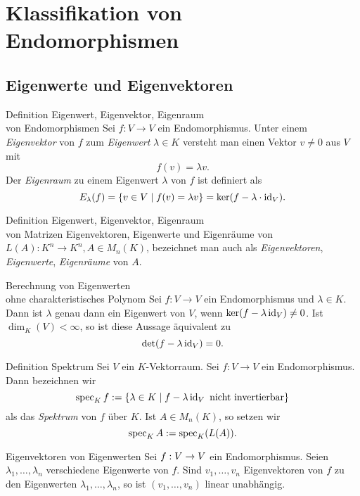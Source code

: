 \documentclass[main.tex]{subfiles}
\begin{document}
\section*{Klassifikation von Endomorphismen}
\subsection*{Eigenwerte und Eigenvektoren}

\begin{karte}{Definition Eigenwert, Eigenvektor, Eigenraum\\von Endomorphismen}
    Sei \( f: V \rightarrow V \) ein Endomorphismus. Unter 
    einem \textit{Eigenvektor} von \(f\) zum \textit{Eigenwert} 
    \(\lambda \in K\) versteht man einen Vektor \(v \neq 0\) aus 
    \(V\) mit 
    \[ f(v) = \lambda v. \]
    Der \textit{Eigenraum} zu einem Eigenwert \( \lambda \) von 
    \(f\) ist definiert als 
    \[ E_\lambda(f) = \{ v \in V \;\vert \; f(v) = \lambda v \} 
    = \ker(f - \lambda \cdot \operatorname{id}_V). \]
\end{karte}
\begin{karte}{Definition Eigenwert, Eigenvektor, Eigenraum\\von Matrizen}
    Eigenvektoren, Eigenwerte und Eigenräume von 
    \( L(A) : K^n \rightarrow K^n, A \in M_n(K) \), bezeichnet 
    man auch als \textit{Eigenvektoren}, \textit{Eigenwerte}, 
    \textit{Eigenräume} von \(A\).
\end{karte}
\begin{karte}{Berechnung von Eigenwerten\\ohne charakteristisches Polynom}
    Sei \( f: V \rightarrow V \) ein Endomorphismus und 
    \( \lambda \in K \). Dann ist \( \lambda \) genau dann ein 
    Eigenwert von \( V \), wenn 
    \( \ker(f - \lambda \operatorname{id}_V) \neq 0 \). Ist 
    \( \dim_K(V) < \infty \), so ist diese Aussage äquivalent zu 
    \[ \det(f - \lambda \operatorname{id}_V) = 0. \]
\end{karte}
\begin{karte}{Definition Spektrum}
    Sei \(V\) ein \(K\)-Vektorraum. Sei 
    \( f: V \rightarrow V \) ein Endomorphismus. Dann 
    bezeichnen wir 
    \[ \operatorname{spec}_K f := \{ \lambda \in K 
    \;\vert \; f - \lambda \operatorname{id}_V \text{ nicht invertierbar} \} \]
    als das \textit{Spektrum} von \(f\) über \(K\). Ist 
    \( A \in M_n(K) \), so setzen wir 
    \[ \operatorname{spec}_K A := \operatorname{spec}_K(L(A)). \]
\end{karte}
\begin{karte}{Eigenvektoren von Eigenwerten}
    Sei \( f : V \rightarrow V \) ein Endomorphismus. Seien 
    \( \lambda_1,\ldots,\lambda_n \) verschiedene Eigenwerte 
    von \(f\). Sind \( v_1, \ldots, v_n \) Eigenvektoren von 
    \(f\) zu den Eigenwerten \( \lambda_1, \ldots, \lambda_n \), 
    so ist \( (v_1,\ldots,v_n) \) linear unabhängig.
\end{karte}
\end{document}
